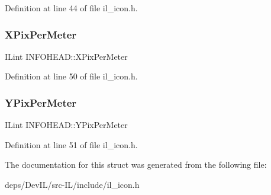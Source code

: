 Definition at line 44 of file il\+\_\+icon.\+h.

\mbox{\label{structINFOHEAD_a00e49cc1b140d47713ec036381348306}} 
\subsubsection{\texorpdfstring{X\+Pix\+Per\+Meter}{XPixPerMeter}}
{\footnotesize\ttfamily I\+Lint I\+N\+F\+O\+H\+E\+A\+D\+::\+X\+Pix\+Per\+Meter}



Definition at line 50 of file il\+\_\+icon.\+h.

\mbox{\label{structINFOHEAD_a3fb20d019986d3df213def8d6575ff3c}} 
\subsubsection{\texorpdfstring{Y\+Pix\+Per\+Meter}{YPixPerMeter}}
{\footnotesize\ttfamily I\+Lint I\+N\+F\+O\+H\+E\+A\+D\+::\+Y\+Pix\+Per\+Meter}



Definition at line 51 of file il\+\_\+icon.\+h.



The documentation for this struct was generated from the following file\+:\begin{DoxyCompactItemize}
\item 
deps/\+Dev\+I\+L/src-\/\+I\+L/include/il\+\_\+icon.\+h\end{DoxyCompactItemize}

